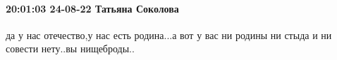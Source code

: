  
 
 
 
 

\paragraph{20:01:03 24-08-22 Татьяна Соколова}

да у нас отечество,у нас есть родина...а вот у вас ни родины ни стыда и ни
совести нету..вы нищеброды..
